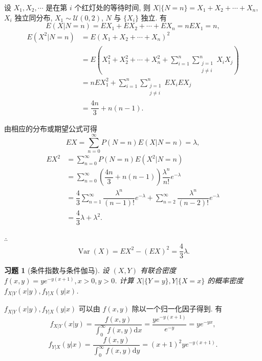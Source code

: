 \documentclass[12pt,fontset=fandol]{ctexart}
\newtheorem{exercise}{习题}[section]
\begin{document}
\begin{solve}\label{a:A6.4}
    设 $X_1,X_2,\cdots$ 是在第 $i$ 个红灯处的等待时间, 则 $X|\{N=n\}=X_1+X_2+\cdots+X_n$, $X_i$ 独立同分布, $X_1\sim\mathcal{U}(0,2)$, $N$ 与 $\{X_i\}$ 独立. 有
    \[E(X|N=n)=EX_1+EX_2+\cdots+EX_n=nEX_1=n,\]
    \begin{align*}
        E(X^2|N=n) & =E(X_1+X_2+\cdots+X_n)^2 \\
        & =E\left(X_1^2+X_2^2+\cdots+X_n^2+\sum\limits_{i=1}^n\sum\limits_{\substack{j=1\\j\neq i}}^nX_iX_j\right) \\
        & =nEX_1^2+\sum\limits_{i=1}^n\sum\limits_{\substack{j=1\\j\neq i}}^nEX_iEX_j \\
        & =\dfrac{4n}{3}+n(n-1).
    \end{align*}

    由相应的分布或期望公式可得
    \[EX=\sum\limits_{n=0}^\infty P(N=n)E(X|N=n)=\lambda,\]
    \begin{align*}
        EX^2 & =\sum\limits_{n=0}^\infty P(N=n)E(X^2|N=n) \\
        & =\sum\limits_{n=0}^\infty\left(\dfrac{4n}{3}+n(n-1)\right)\dfrac{\lambda^n}{n!}e^{-\lambda}  \\
        & =\dfrac{4}{3}\sum\limits_{n=1}^\infty\dfrac{\lambda^n}{(n-1)!}e^{-\lambda}+\sum\limits_{n=2}^\infty\dfrac{\lambda^n}{(n-2)!}e^{-\lambda}  \\
        & =\dfrac{4}{3}\lambda+\lambda^2.
    \end{align*}

    $\therefore$
    \[\operatorname{Var}(X)=EX^2-(EX)^2=\dfrac{4}{3}\lambda.\]
\end{solve}

\begin{exercise}[条件指数与条件伽马]\label{q:A6.9}
设 $(X,Y)$ 有联合密度 $f(x,y)=ye^{-y(x+1)},x>0,y>0$. 计算 $X|\{Y=y\},Y|\{X=x\}$ 的概率密度 $f_{X|Y}(x|y),f_{Y|X}(y|x)$.\par{}
\end{exercise}

\begin{solve}\label{a:A6.9}
    $f_{X|Y}(x|y),f_{Y|X}(y|x)$ 可以由 $f(x,y)$ 除以一个归一化因子得到. 有
    \[f_{X|Y}(x|y)=\dfrac{f(x,y)}{\int_0^\infty f(x,y)\mathrm{d}x}=\dfrac{ye^{-y(x+1)}}{e^{-y}}=ye^{-yx},\]
    \[f_{Y|X}(y|x)=\dfrac{f(x,y)}{\int_0^\infty f(x,y)\mathrm{d}y}=(x+1)^2ye^{-y(x+1)}.\]
\end{solve}
\end{document}
